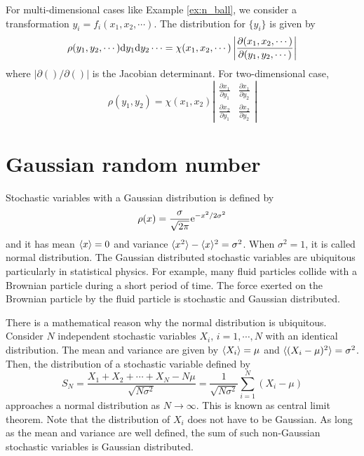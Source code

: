 For multi-dimensional cases like Example \ref{ex:n_ball}, we consider a transformation $y_i= f_i(x_1, x_2, \cdots)$.
The distribution for $\{y_i\}$ is given by
\begin{equation}\label{eq:nd_transform}
\rho(y_1, y_2, \cdots) \text{d} y_1 \text{d} y_2 \cdots = \chi(x_1, x_2, \cdots ) \left | \frac{\partial (x_1, x_2, \cdots)}{\partial (y_1, y_2, \cdots)} \right |
\end{equation} 
where $|\partial ()/\partial ()|$ is the Jacobian determinant.  For two-dimensional case, 
\begin{equation}\label{eq:2d_transform}
\rho(y_1, y_2) = \chi(x_1, x_2) \left | \begin{matrix} \frac{\partial x_1}{\partial y_1} & \frac{\partial x_1}{\partial y_2} \\[1.5ex]
 \frac{\partial x_2}{\partial y_1} & \frac{\partial x_2}{\partial y_2} \end{matrix} \right |
\end{equation}

\noindent
\section{Gaussian random number}

Stochastic variables with a Gaussian distribution is defined by 
\begin{equation}\label{eq:Gaussian}
\rho(x) = \frac{\sigma}{\sqrt{2 \pi}} \text{e}^{-x^2/2 \sigma^2}
\end{equation} 
and  it has mean $\langle x \rangle=0$ and variance $\langle x^2 \rangle - \langle x \rangle^2=\sigma^2$.  When $\sigma^2=1$, it is called normal distribution.
The Gaussian distributed stochastic variables are ubiquitous particularly in statistical physics. For example, many fluid particles collide with a Brownian particle during a short period of time. The force exerted on the Brownian particle by the fluid particle is stochastic and Gaussian distributed. 

There is a mathematical reason why the normal distribution is ubiquitous. Consider $N$ independent stochastic variables  $X_i,\,  i=1, \cdots, N$ with an identical distribution. The mean and variance are given by $\langle X_i \rangle=\mu$ and $\langle (X_i-\mu)^2 \rangle=\sigma^2$.  Then, the distribution of a stochastic variable defined by 
\begin{equation}
S_N = \frac{X_1 + X_2 + \cdots + X_N - N \mu}{\sqrt{N \sigma^2}} = \frac{1}{\sqrt{N \sigma^2}} \sum_{i=1}^N (X_i - \mu)
\end{equation}
approaches a normal distribution as $N \rightarrow \infty$.  This is known as central limit theorem.\cite{central_limit_theorem} Note that the distribution of $X_i$ does not have to be Gaussian.  As long as the mean and variance are well defined, the sum of such non-Gaussian stochastic variables is Gaussian distributed.

